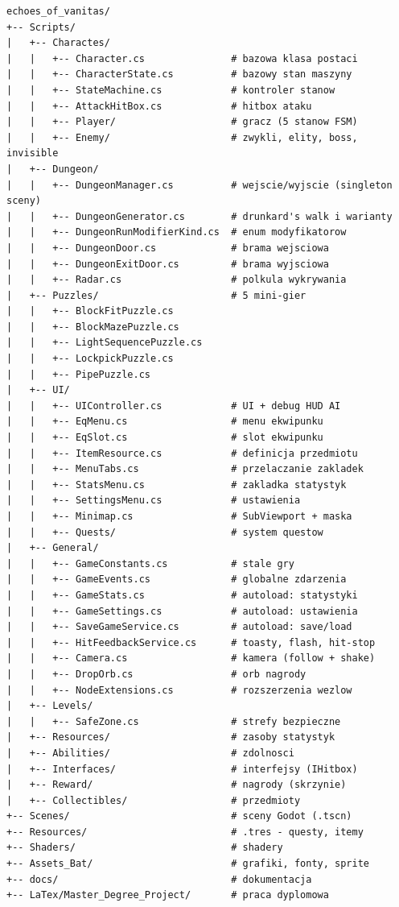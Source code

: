 {\small
\begin{verbatim}
echoes_of_vanitas/
+-- Scripts/
|   +-- Charactes/
|   |   +-- Character.cs               # bazowa klasa postaci
|   |   +-- CharacterState.cs          # bazowy stan maszyny
|   |   +-- StateMachine.cs            # kontroler stanow
|   |   +-- AttackHitBox.cs            # hitbox ataku
|   |   +-- Player/                    # gracz (5 stanow FSM)
|   |   +-- Enemy/                     # zwykli, elity, boss, invisible
|   +-- Dungeon/
|   |   +-- DungeonManager.cs          # wejscie/wyjscie (singleton sceny)
|   |   +-- DungeonGenerator.cs        # drunkard's walk i warianty
|   |   +-- DungeonRunModifierKind.cs  # enum modyfikatorow
|   |   +-- DungeonDoor.cs             # brama wejsciowa
|   |   +-- DungeonExitDoor.cs         # brama wyjsciowa
|   |   +-- Radar.cs                   # polkula wykrywania
|   +-- Puzzles/                       # 5 mini-gier
|   |   +-- BlockFitPuzzle.cs
|   |   +-- BlockMazePuzzle.cs
|   |   +-- LightSequencePuzzle.cs
|   |   +-- LockpickPuzzle.cs
|   |   +-- PipePuzzle.cs
|   +-- UI/
|   |   +-- UIController.cs            # UI + debug HUD AI
|   |   +-- EqMenu.cs                  # menu ekwipunku
|   |   +-- EqSlot.cs                  # slot ekwipunku
|   |   +-- ItemResource.cs            # definicja przedmiotu
|   |   +-- MenuTabs.cs                # przelaczanie zakladek
|   |   +-- StatsMenu.cs               # zakladka statystyk
|   |   +-- SettingsMenu.cs            # ustawienia
|   |   +-- Minimap.cs                 # SubViewport + maska
|   |   +-- Quests/                    # system questow
|   +-- General/
|   |   +-- GameConstants.cs           # stale gry
|   |   +-- GameEvents.cs              # globalne zdarzenia
|   |   +-- GameStats.cs               # autoload: statystyki
|   |   +-- GameSettings.cs            # autoload: ustawienia
|   |   +-- SaveGameService.cs         # autoload: save/load
|   |   +-- HitFeedbackService.cs      # toasty, flash, hit-stop
|   |   +-- Camera.cs                  # kamera (follow + shake)
|   |   +-- DropOrb.cs                 # orb nagrody
|   |   +-- NodeExtensions.cs          # rozszerzenia wezlow
|   +-- Levels/
|   |   +-- SafeZone.cs                # strefy bezpieczne
|   +-- Resources/                     # zasoby statystyk
|   +-- Abilities/                     # zdolnosci
|   +-- Interfaces/                    # interfejsy (IHitbox)
|   +-- Reward/                        # nagrody (skrzynie)
|   +-- Collectibles/                  # przedmioty
+-- Scenes/                            # sceny Godot (.tscn)
+-- Resources/                         # .tres - questy, itemy
+-- Shaders/                           # shadery
+-- Assets_Bat/                        # grafiki, fonty, sprite
+-- docs/                              # dokumentacja
+-- LaTex/Master_Degree_Project/       # praca dyplomowa
\end{verbatim}
}

